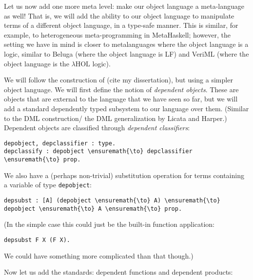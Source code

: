 Let us now add one more meta level: make our object language a
meta-language as well! That is, we will add the ability to our object
language to manipulate terms of a different object language, in a
type-safe manner. This is similar, for example, to heterogeneous
meta-programming in MetaHaskell; however, the setting we have in mind is
closer to metalanguages where the object language is a logic, similar to
Beluga (where the object language is LF) and VeriML (where the object
language is the \(\lambda\text{HOL}\) logic).

We will follow the construction of (cite my dissertation), but using a
simpler object language. We will first define the notion of
\emph{dependent objects}. These are objects that are external to the
language that we have seen so far, but we will add a standard
dependently typed subsystem to our language over them. (Similar to the
DML construction/ the DML generalization by Licata and Harper.)
Dependent objects are classified through \emph{dependent classifiers}:

\begin{verbatim}
depobject, depclassifier : type.
depclassify : depobject \ensuremath{\to} depclassifier \ensuremath{\to} prop.
\end{verbatim}

We also have a (perhaps non-trivial) substitution operation for terms
containing a variable of type \texttt{depobject}:

\begin{verbatim}
depsubst : [A] (depobject \ensuremath{\to} A) \ensuremath{\to} depobject \ensuremath{\to} A \ensuremath{\to} prop.
\end{verbatim}

(In the simple case this could just be the built-in function
application:

\begin{verbatim}
depsubst F X (F X).
\end{verbatim}

We could have something more complicated than that though.)

Now let us add the standards: dependent functions and dependent
products:

